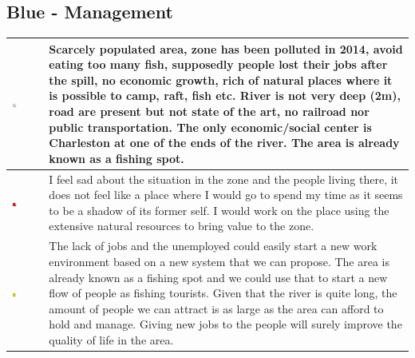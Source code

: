 \subsection{Blue - Management}
\begin{center}
\begin{tabular}{ | m{} | m{}| } 
\hline
\includegraphics[width=0.20\textwidth]{Img/White.png} & Scarcely populated area, zone has been polluted in 2014, avoid eating too many fish, supposedly people lost their jobs after the spill, no economic growth, rich of natural places where it is possible to camp, raft, fish etc. \newline River is not very deep (2m), road are present but not state of the art, no railroad nor public transportation. \newline The only economic/social center is Charleston at one of the ends of the river. \newline The area is already known as a fishing spot. \\ 
\hline
\includegraphics[width=0.20\textwidth]{Img/Red.png} & I feel sad about the situation in the zone and the people living there, it does not feel like a place where I would go to spend my time as it seems to be a shadow of its former self. \newline I would work on the place using the extensive natural resources to bring value to the zone. \\  
\hline
\includegraphics[width=0.20\textwidth]{Img/Yellow.png} & The lack of jobs and the unemployed could easily start a new work environment based on a new system that we can propose. \newline The area is already known as a fishing spot and we could use that to start a new flow of people as fishing tourists. \newline Given that the river is quite long, the amount of people we can attract is as large as the area can afford to hold and manage. \newline Giving new jobs to the people will surely improve the quality of life in the area. \\  

\end{tabular}
\end{center}

